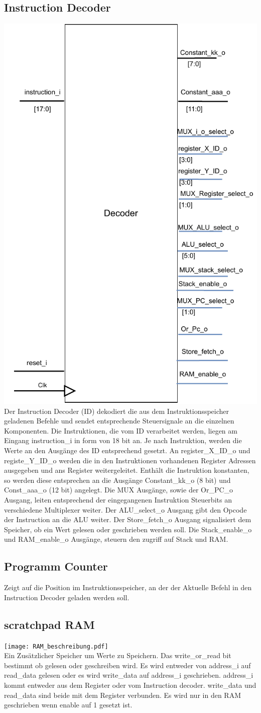 \documentclass{scrartcl}
\begin{document}
\subsection{Instruction Decoder}
\includegraphics[height=0.7\textwidth, angle=0]{ID_beschreibung.pdf}\\
Der Instruction Decoder (ID) dekodiert die aus dem Instruktionsspeicher geladenen Befehle und sendet entsprechende Steuersignale an die einzelnen Komponenten. Die Instruktionen, die vom ID verarbeitet werden, liegen am Eingang instruction\_i in form von 18 bit an. Je nach Instruktion, werden die Werte an den Ausgänge des ID entsprechend gesetzt. An register\_X\_ID\_o und registe\_Y\_ID\_o werden die in den Instruktionen vorhandenen Register Adressen ausgegeben und ans Register weitergeleitet.
Enthält die Instruktion konstanten, so werden diese entsprechen an die Ausgänge Constant\_kk\_o (8 bit) und Const\_aaa\_o (12 bit) angelegt. Die MUX Ausgänge, sowie der Or\_PC\_o Ausgang, leiten entsprechend der eingegangenen Instruktion Steuerbits an verschiedene Multiplexer weiter. Der ALU\_select\_o Ausgang gibt den Opcode der Instruction an die ALU weiter. Der Store\_fetch\_o Ausgang signalisiert dem Speicher, ob ein Wert gelesen oder geschrieben werden soll. Die Stack\_enable\_o und RAM\_enable\_o Ausgänge, steuern den zugriff auf Stack und RAM.
\subsection{Programm Counter}
Zeigt auf die Position im Instruktionsspeicher, an der der Aktuelle Befehl in den Instruction Decoder geladen werden soll.
\subsection{scratchpad RAM}
\texttt{[image: RAM\_beschreibung.pdf]}\\
Ein Zusätzlicher Speicher um Werte zu Speichern. Das write\_or\_read bit bestimmt ob gelesen oder geschreiben wird. Es wird entweder von address\_i auf read\_data gelesen  oder es wird write\_data auf address\_i geschrieben. address\_i kommt entweder aus dem Register oder vom Instruction decoder. write\_data und read\_data sind beide mit dem Register verbunden. Es wird nur in den RAM geschrieben wenn enable auf 1 gesetzt ist.
\end{document}
